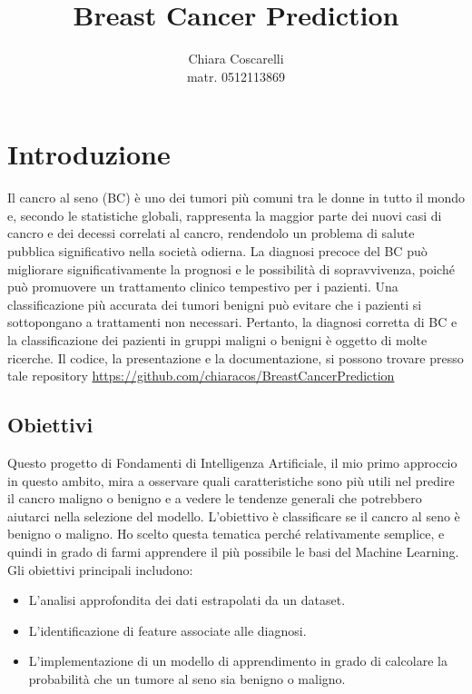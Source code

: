 \documentclass{article}
\title{Breast Cancer Prediction}
\author{Chiara Coscarelli\\[1ex]matr. 0512113869}
\begin{document}
\maketitle

\newpage
\tableofcontents
\newpage
\section{Introduzione}

Il cancro al seno (BC) è uno dei tumori più comuni tra le donne in tutto il mondo e, secondo le statistiche globali, rappresenta la maggior parte dei nuovi casi di cancro e dei decessi correlati al cancro, rendendolo un problema di salute pubblica significativo nella società odierna. La diagnosi precoce del BC può migliorare significativamente la prognosi e le possibilità di sopravvivenza, poiché può promuovere un trattamento clinico tempestivo per i pazienti. Una classificazione più accurata dei tumori benigni può evitare che i pazienti si sottopongano a trattamenti non necessari. Pertanto, la diagnosi corretta di BC e la classificazione dei pazienti in gruppi maligni o benigni è oggetto di molte ricerche.
Il codice, la presentazione e la documentazione, si possono trovare presso tale repository
\url{https://github.com/chiaracos/BreastCancerPrediction}


\subsection{Obiettivi}
Questo progetto di Fondamenti di Intelligenza Artificiale, il mio primo approccio in questo ambito, mira a osservare quali caratteristiche sono più utili nel predire il cancro maligno o benigno e a vedere le tendenze generali che potrebbero aiutarci nella selezione del modello. L’obiettivo è classificare se il cancro al seno è benigno o maligno. Ho scelto questa tematica perché relativamente semplice, e quindi in grado di farmi apprendere il più possibile le basi del Machine Learning.
Gli obiettivi principali includono:
\begin{itemize}
    \item L'analisi approfondita dei dati estrapolati da un dataset.
    \item L'identificazione di feature associate alle diagnosi.
    \item L'implementazione di un modello di apprendimento in grado di calcolare la probabilità che un tumore al seno sia benigno o maligno.
\end{itemize}
\end{document}
